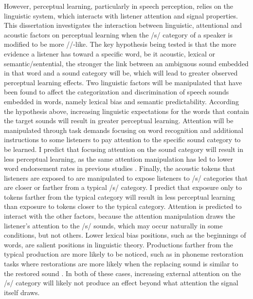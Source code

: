 However, perceptual learning, particularly in speech perception, relies on the linguistic system, which interacts with listener attention and signal properties.
This dissertation investigates the interaction between linguistic, attentional and acoustic factors on perceptual learning when the /s/ category of a speaker is modified to be more /\textesh/-like.
The key hypothesis being tested is that the more evidence a listener has toward a specific word, be it acoustic, lexical or semantic/sentential, the stronger the link between an ambiguous sound embedded in that word and a sound category will be, which will lead to greater observed perceptual learning effects.
Two linguistic factors will be manipulated that have been found to affect the categorization and discrimination of speech sounds embedded in words, namely lexical bias and semantic predictability.
According the hypothesis above, increasing linguistic expectations for the words that contain the target sounds will result in greater perceptual learning.
Attention will be manipulated through task demands focusing on word recognition and additional instructions to some listeners to pay attention to the specific sound category to be learned.
I predict that focusing attention on the sound category will result in less perceptual learning, as the same attention manipulation has led to lower word endorsement rates in previous studies \citep{Pitt2012}.
Finally, the acoustic tokens that listeners are exposed to are manipulated to expose listeners to /s/ categories that are closer or farther from a typical /s/ category.
I predict that exposure only to tokens farther from the typical category will result in less perceptual learning than exposure to tokens closer to the typical category.
Attention is predicted to interact with the other factors, because the attention manipulation draws the listener's attention to the /s/ sounds, which may occur naturally in some conditions, but not others.
Lower lexical bias positions, such as the beginnings of words, are salient positions in linguistic theory. 
Productions farther from the typical production are more likely to be noticed, such as in phoneme restoration tasks where restorations are more likely when the replacing sound is similar to the restored sound \citep{Samuel1981}.
In both of these cases, increasing external attention on the /s/ category will likely not produce an effect beyond what attention the signal itself draws.

